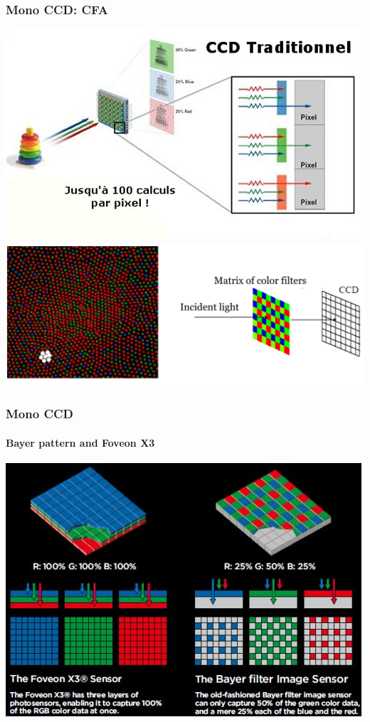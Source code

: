 \documentclass{beamer}
\begin{document}
\begin{frame}
\frametitle{Mono CCD: CFA}
\begin{center}
\includegraphics[scale= 0.45]{images/L7_monoCCD.jpg}\\
\includegraphics[scale=0.2]{images/L7_monoCCD2.png}
\end{center}
\end{frame}
\begin{frame}
\frametitle{Mono CCD}
\framesubtitle{Bayer pattern and Foveon X3}
\begin{center}
\includegraphics[scale=0.5]{images/L7_foveon_x3_Bayer.jpg}
\end{center}
\end{frame}
\end{document}
